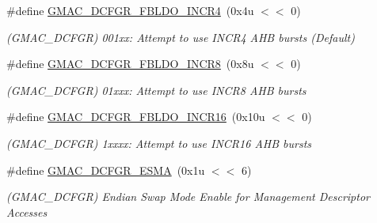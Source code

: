 \begin{DoxyCompactItemize}
\mbox{\label{group__SAME70__GMAC_ga4d72e5ffe0ae8177ce94e06f1bdf7f7e}} 
\#define \mbox{\hyperlink{group__SAME70__GMAC_ga4d72e5ffe0ae8177ce94e06f1bdf7f7e}{G\+M\+A\+C\+\_\+\+D\+C\+F\+G\+R\+\_\+\+F\+B\+L\+D\+O\+\_\+\+I\+N\+C\+R4}}~(0x4u $<$$<$ 0)
\begin{DoxyCompactList}\small\item\em (G\+M\+A\+C\+\_\+\+D\+C\+F\+GR) 001xx\+: Attempt to use I\+N\+C\+R4 A\+HB bursts (Default) \end{DoxyCompactList}\item 
\mbox{\label{group__SAME70__GMAC_ga76aca0328bdde04f45ea18aaed5dbc9c}} 
\#define \mbox{\hyperlink{group__SAME70__GMAC_ga76aca0328bdde04f45ea18aaed5dbc9c}{G\+M\+A\+C\+\_\+\+D\+C\+F\+G\+R\+\_\+\+F\+B\+L\+D\+O\+\_\+\+I\+N\+C\+R8}}~(0x8u $<$$<$ 0)
\begin{DoxyCompactList}\small\item\em (G\+M\+A\+C\+\_\+\+D\+C\+F\+GR) 01xxx\+: Attempt to use I\+N\+C\+R8 A\+HB bursts \end{DoxyCompactList}\item 
\mbox{\label{group__SAME70__GMAC_ga7b4abe40b1704d8b097072c9fffc2363}} 
\#define \mbox{\hyperlink{group__SAME70__GMAC_ga7b4abe40b1704d8b097072c9fffc2363}{G\+M\+A\+C\+\_\+\+D\+C\+F\+G\+R\+\_\+\+F\+B\+L\+D\+O\+\_\+\+I\+N\+C\+R16}}~(0x10u $<$$<$ 0)
\begin{DoxyCompactList}\small\item\em (G\+M\+A\+C\+\_\+\+D\+C\+F\+GR) 1xxxx\+: Attempt to use I\+N\+C\+R16 A\+HB bursts \end{DoxyCompactList}\item 
\mbox{\label{group__SAME70__GMAC_gac6317ea33414d67f44f1d86ab1a72419}} 
\#define \mbox{\hyperlink{group__SAME70__GMAC_gac6317ea33414d67f44f1d86ab1a72419}{G\+M\+A\+C\+\_\+\+D\+C\+F\+G\+R\+\_\+\+E\+S\+MA}}~(0x1u $<$$<$ 6)
\begin{DoxyCompactList}\small\item\em (G\+M\+A\+C\+\_\+\+D\+C\+F\+GR) Endian Swap Mode Enable for Management Descriptor Accesses \end{DoxyCompactList}\item 
\mbox{\label{group__SAME70__GMAC_ga27eb39d9c03abd7ee291fe0a2a4cf9d7}} 

\end{DoxyCompactItemize}
